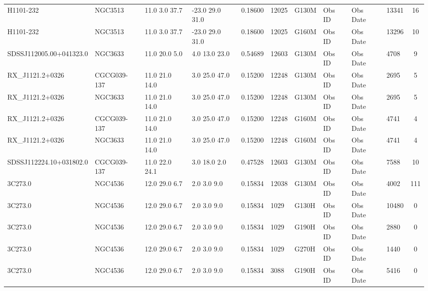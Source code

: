 \documentclass[iop]{emulateapj-rtx4}
\begin{document}
\begin{table}[ht]
\begin{center}
\begin{tabular}{l l l l l l l l l l c}
H1101-232  				&      NGC3513  	&       11.0  3.0  37.7  &    -23.0  29.0  31.0  &   0.18600  & 12025  &   G130M  &   Obs ID  & Obs Date  & 13341  &      16         \\
H1101-232  				&      NGC3513  	&       11.0  3.0  37.7  &    -23.0  29.0  31.0  &   0.18600  & 12025  &   G160M  &   Obs ID  & Obs Date  & 13296  &      10         \\
SDSSJ112005.00+041323.0  	& 	NGC3633  	&       11.0  20.0  5.0  &    4.0  13.0  23.0  &     0.54689  & 12603  &   G130M  &   Obs ID  & Obs Date  & 4708  &       9            \\
RX\_J1121.2+0326  			&      CGCG039-137 &   11.0  21.0  14.0  &   3.0  25.0  47.0  &     0.15200  & 12248  &   G130M  &   Obs ID  & Obs Date  & 2695  &       5           \\
RX\_J1121.2+0326  			&      NGC3633  	&       11.0  21.0  14.0  &   3.0  25.0  47.0  &     0.15200  & 12248  &   G130M  &   Obs ID  & Obs Date  & 2695  &       5          \\
RX\_J1121.2+0326  			&      CGCG039-137 &   11.0  21.0  14.0  &   3.0  25.0  47.0  &     0.15200  & 12248  &   G160M  &   Obs ID  & Obs Date  & 4741  &       4           \\
RX\_J1121.2+0326  			&      NGC3633  	&       11.0  21.0  14.0  &   3.0  25.0  47.0  &     0.15200  & 12248  &   G160M  &   Obs ID  & Obs Date  & 4741  &       4           \\
SDSSJ112224.10+031802.0  	& 	CGCG039-137 &   11.0  22.0  24.1  &   3.0  18.0  2.0  &      0.47528  & 12603  &   G130M  &   Obs ID  & Obs Date  & 7588  &       10          \\
3C273.0  					&	NGC4536  	&       12.0  29.0  6.7  &    2.0  3.0  9.0  &       0.15834  & 12038  &   G130M  &   Obs ID  & Obs Date  & 4002  &       111         \\
3C273.0  					&      NGC4536  	&       12.0  29.0  6.7  &    2.0  3.0  9.0  &       0.15834  & 1029  &    G130H  &   Obs ID  & Obs Date  & 10480  &      0            \\
3C273.0  					&      NGC4536  	&       12.0  29.0  6.7  &    2.0  3.0  9.0  &       0.15834  & 1029  &    G190H  &   Obs ID  & Obs Date  & 2880  &       0            \\
3C273.0  					&      NGC4536  	&       12.0  29.0  6.7  &    2.0  3.0  9.0  &       0.15834  & 1029  &    G270H  &   Obs ID  & Obs Date  & 1440  &       0            \\
3C273.0  					&      NGC4536  	&       12.0  29.0  6.7  &    2.0  3.0  9.0  &       0.15834  & 3088  &    G190H  &   Obs ID  & Obs Date  & 5416  &       0            \\

\end{tabular}
\end{center}
\end{table}
\end{document}
